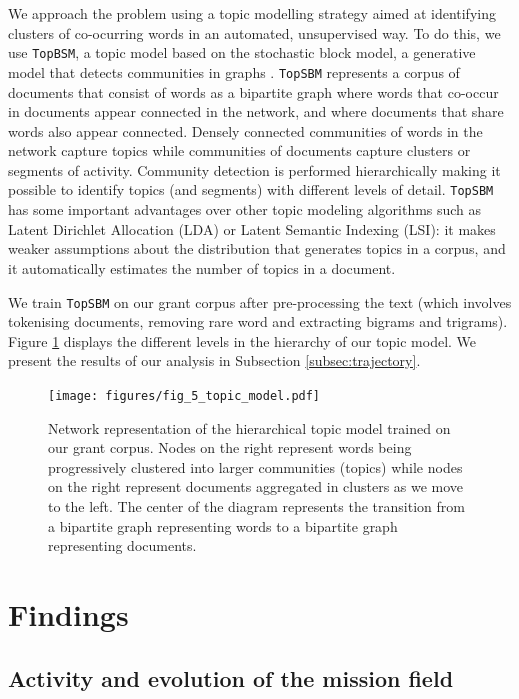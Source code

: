 \documentclass[11pt]{article}
\begin{document}
We approach the problem using a topic modelling strategy aimed at identifying clusters of co-ocurring words in an automated, unsupervised way. To do this, we use \texttt{TopBSM}, a topic model based on the stochastic block model, a generative model that detects communities in graphs \citep{gerlach_network_2018}. \texttt{TopSBM} represents a corpus of documents that consist of words as a bipartite graph where words that co-occur in documents appear connected in the network, and where documents that share words also appear connected. Densely connected communities of words in the network capture topics while communities of documents capture clusters or segments of activity. Community detection is performed hierarchically making it possible to identify topics (and segments) with different levels of detail. \texttt{TopSBM} has some important advantages over other topic modeling algorithms such as Latent Dirichlet Allocation (LDA) or Latent Semantic Indexing (LSI): it makes weaker assumptions about the distribution that generates topics in a corpus, and it automatically estimates the number of topics in a document. 

We train \texttt{TopSBM} on our grant corpus after pre-processing the text (which involves tokenising documents, removing rare word and extracting bigrams and trigrams). Figure \ref{fig:topic_model} displays the different levels in the hierarchy of our topic model. We present the results of our analysis in Subsection \ref{subsec:trajectory}.

\begin{figure}[!ht]
    \centering
    \texttt{[image: figures/fig\_5\_topic\_model.pdf]}
    \caption{Network representation of the hierarchical topic model trained on our grant corpus. Nodes on the right represent words being progressively clustered into larger communities (topics) while nodes on the right represent documents aggregated in clusters as we move to the left. The center of the diagram represents the transition from a bipartite graph representing words to a bipartite graph representing documents.}
    \label{fig:topic_model}
\end{figure}
 
\section{Findings}
\label{sec:findings}

\subsection{Activity and evolution of the mission field}
\end{document}
